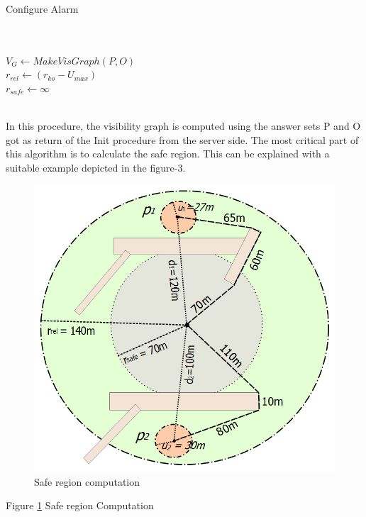 \documentclass{sig-alternate}
\begin{document}
\begin{algorithm}
\caption{Configure Alarm}
\label{ConfigAlarm}
\begin{algorithmic}[4]

    \\
    \\ $V_G \gets MakeVisGraph(P, O)$
    \\ $r_{rel} \gets (r_{ko} - U_{max})$
    \\ $r_{safe} \gets \infty$
    \\
    \\

\EndProcedure
\end{algorithmic}
\end{algorithm}

In this procedure, the visibility graph is computed using the answer sets P and O got as return of the Init procedure from the server side. The most critical part of this algorithm is to calculate the safe region. This can be explained with a suitable example depicted in the figure-3.
\begin{figure}
  \includegraphics[width=\linewidth]{safe_region.png}
  \caption{Safe region computation}
  \label{fig:safe_region}
\end{figure} 
Figure \ref{fig:safe_region} Safe region Computation
\end{document}
